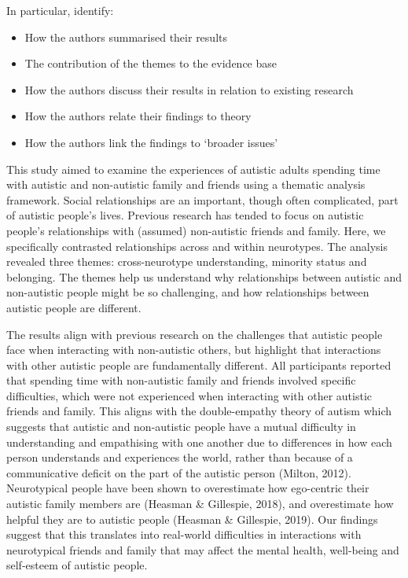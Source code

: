 \documentclass[
  english,
  letterpaper,
  DIV=11,
  numbers=noendperiod]{scrreprt}
\providecommand{\tightlist}{%
  \setlength{\itemsep}{0pt}\setlength{\parskip}{0pt}}
\begin{document}
In particular, identify:

\begin{itemize}
\tightlist
\item
  How the authors summarised their results
\item
  The contribution of the themes to the evidence base
\item
  How the authors discuss their results in relation to existing research
\item
  How the authors relate their findings to theory
\item
  How the authors link the findings to `broader issues'
\end{itemize}

\begin{tcolorbox}[enhanced jigsaw, breakable, bottomtitle=1mm, leftrule=.75mm, opacityback=0, colbacktitle=quarto-callout-note-color!10!white, opacitybacktitle=0.6, toprule=.15mm, colback=white, left=2mm, coltitle=black, bottomrule=.15mm, titlerule=0mm, title={Study 1: Crompton et al., 2020}, toptitle=1mm, colframe=quarto-callout-note-color-frame, arc=.35mm, rightrule=.15mm]

This study aimed to examine the experiences of autistic adults spending
time with autistic and non-autistic family and friends using a thematic
analysis framework. Social relationships are an important, though often
complicated, part of autistic people's lives. Previous research has
tended to focus on autistic people's relationships with (assumed)
non-autistic friends and family. Here, we specifically contrasted
relationships across and within neurotypes. The analysis revealed three
themes: cross-neurotype understanding, minority status and belonging.
The themes help us understand why relationships between autistic and
non-autistic people might be so challenging, and how relationships
between autistic people are different.

The results align with previous research on the challenges that autistic
people face when interacting with non-autistic others, but highlight
that interactions with other autistic people are fundamentally
different. All participants reported that spending time with
non-autistic family and friends involved specific difficulties, which
were not experienced when interacting with other autistic friends and
family. This aligns with the double-empathy theory of autism which
suggests that autistic and non-autistic people have a mutual difficulty
in understanding and empathising with one another due to differences in
how each person understands and experiences the world, rather than
because of a communicative deficit on the part of the autistic person
(Milton, 2012). Neurotypical people have been shown to overestimate how
ego-centric their autistic family members are (Heasman \& Gillespie,
2018), and overestimate how helpful they are to autistic people (Heasman
\& Gillespie, 2019). Our findings suggest that this translates into
real-world difficulties in interactions with neurotypical friends and
family that may affect the mental health, well-being and self-esteem of
autistic people.

\end{tcolorbox}
\end{document}
